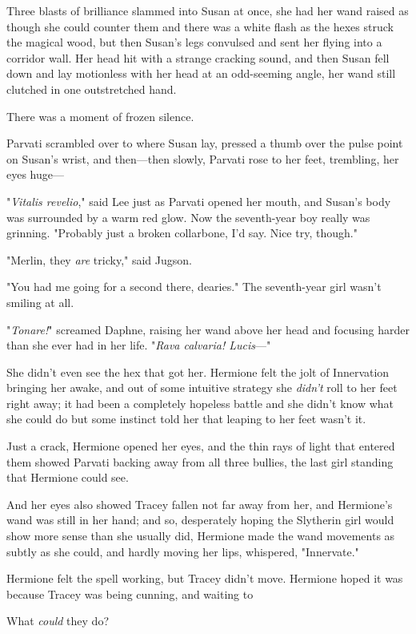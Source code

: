 Three blasts of brilliance slammed into Susan at once, she had her wand raised
as though she could counter them and there was a white flash as the hexes
struck the magical wood, but then Susan's legs convulsed and sent her flying
into a corridor wall. Her head hit with a strange cracking sound, and then
Susan fell down and lay motionless with her head at an odd-seeming angle, her
wand still clutched in one outstretched hand.

There was a moment of frozen silence.

Parvati scrambled over to where Susan lay, pressed a thumb over the pulse point
on Susan's wrist, and then---then slowly, Parvati rose to her
feet, trembling, her eyes huge---

"\emph{Vitalis revelio}," said Lee just as Parvati opened her mouth, and
Susan's body was surrounded by a warm red glow. Now the seventh-year boy really
was grinning. "Probably just a broken collarbone, I'd say. Nice try, though."

"Merlin, they \emph{are} tricky," said Jugson.

"You had me going for a second there, dearies." The seventh-year girl wasn't
smiling at all.

"\emph{Tonare!}" screamed Daphne, raising her wand above her head and focusing
harder than she ever had in her life. "\emph{Rava calvaria! Lucis}\mbox{---}"

She didn't even see the hex that got her.
\sbreak
Hermione felt the jolt of Innervation bringing her awake, and out of some
intuitive strategy she \emph{didn't} roll to her feet right away; it had been
a completely hopeless battle and she didn't know what she could do but some
instinct told her that leaping to her feet wasn't it.

Just a crack, Hermione opened her eyes, and the thin rays of light that entered
them showed Parvati backing away from all three bullies, the last girl standing
that Hermione could see.

And her eyes also showed Tracey fallen not far away from her, and Hermione's
wand was still in her hand; and so, desperately hoping the Slytherin girl would
show more sense than she usually did, Hermione made the wand movements as
subtly as she could, and hardly moving her lips, whispered, "Innervate."

Hermione felt the spell working, but Tracey didn't move. Hermione hoped it was
because Tracey was being cunning, and waiting to{\el}

What \emph{could} they do?

